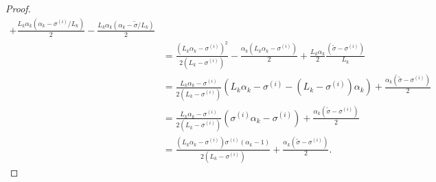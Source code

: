 \documentclass[12pt]{article}
\begin{document}
\begin{proof}
{\begin{align*}
            + \frac{L_k\alpha_k(\alpha_k - \sigma^{(i)}/L_k)}{2} 
            - \frac{L_k\alpha_k(\alpha_k - \tilde \sigma/L_k)}{2} 
            \\
            &= 
            \frac{\left(
                L_k\alpha_k - \sigma^{(i)}
            \right)^2}{2(L_k - \sigma^{(i)})} 
            - \frac{\alpha_k\left(L_k\alpha_k - \sigma^{(i)}\right)}{2}
            + \frac{L_k\alpha_k}{2}
            \frac{\left(
                \tilde \sigma - \sigma^{(i)}
            \right)}{L_k}
            \\
            &=
            \frac{L_k \alpha_k - \sigma^{(i)}}{2(L_k - \sigma^{(i)})}\left(
                L_k \alpha_k - \sigma^{(i)} 
                - \left(L_k - \sigma^{(i)}\right)\alpha_k
            \right)
            + \frac{\alpha_k(\tilde \sigma - \sigma^{(i)})}{2}
            \\
            &= \frac{L_k \alpha_k - \sigma^{(i)}}{2(L_k - \sigma^{(i)})}\left(
                \sigma^{(i)}\alpha_k - \sigma^{(i)} 
            \right)
            + \frac{\alpha_k(\tilde \sigma - \sigma^{(i)})}{2}
            \\
            &= 
            \frac{
                \left(L_k \alpha_k - \sigma^{(i)}\right)\sigma^{(i)}
                \left(\alpha_k - 1\right)
            }
            {2(L_k - \sigma^{(i)})}
            + \frac{\alpha_k(\tilde \sigma - \sigma^{(i)})}{2}. 
        \end{align*}   
        } 
    \end{proof}
\end{document}
